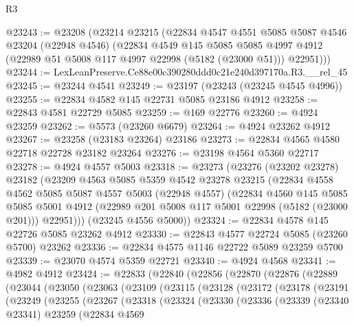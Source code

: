 \begin{lexlean}{R3}
\begin{coremodule}
@23243 := @23208
    (@23214
      @23215
      (@22834
        @4547
        @4551
        @5085
        @5087
        @4546
        @23204
        (@22948 @4546)
        (@22834
          @4549
          @145
          @5085
          @5085
          @4997
          @4912
          (@22989 @51 @5008 @117 @4997 @22998 (@5182 (@23000 @51)))
          @22951)))
@23244 := LexLeanPreserve.Ce88e00c390280ddd0c21e240d397170a.R3.__rel_45
@23245 := @23244 @4541
@23249 := @23197 (@23243 (@23245 @4545 @4996))
@23255 := @22834 @4582 @145 @22731 @5085 @23186 @4912
@23258 := @22843 @4581 @22729 @5085
@23259 := @169 @22776
@23260 := @4924 @23259
@23262 := @5573 (@23260 @6679)
@23264 := @4924 @23262 @4912
@23267 := @23258 (@23183 @23264) @23186
@23273 := @22834 @4565 @4580 @22718 @22728 @23182 @23264
@23276 := @23198 @4564 @5360 @22717
@23278 := @4924 @4557 @5003
@23318 := @23273
    (@23276
      (@23202 @23278)
      @23182
      (@23209
        @4563
        @5085
        @5359
        @4542
        @23278
        @23215
        (@22834
          @4558
          @4562
          @5085
          @5087
          @4557
          @5003
          (@22948 @4557)
          (@22834
            @4560
            @145
            @5085
            @5085
            @5001
            @4912
            (@22989 @201 @5008 @117 @5001 @22998 (@5182 (@23000 @201)))
            @22951)))
      (@23245 @4556 @5000))
@23324 := @22834 @4578 @145 @22726 @5085 @23262 @4912
@23330 := @22843 @4577 @22724 @5085 (@23260 @5700) @23262
@23336 := @22834 @4575 @1146 @22722 @5089 @23259 @5700
@23339 := @23070 @4574 @5359 @22721
@23340 := @4924 @4568
@23341 := @4982 @4912
@23424 := @22833
    (@22840
      (@22856
        (@22870
          (@22876
            (@22889
              (@23044
                (@23050
                  (@23063
                    (@23109
                      (@23115
                        (@23128
                          (@23172
                            (@23178
                              (@23191
                                (@23249
                                  (@23255
                                    (@23267
                                      (@23318
                                        (@23324
                                          (@23330
                                            (@23336
                                              (@23339
                                                (@23340 @23341)
                                                @23259
                                                (@22834
                                                  @4569

\end{coremodule}
\end{lexlean}
